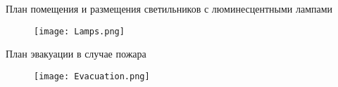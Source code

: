 \begingroup
\centering

\Appendix\label{appendix:lights}
\fancyfoot[R]{}
План помещения и размещения светильников с люминесцентными лампами
\begin{figure}[h]
    \centering
    \texttt{[image: Lamps.png]}
\end{figure}

\begin{landscape}
\Appendix\label{appendix:evacuation}
План эвакуации в случае пожара
\begin{figure}[h]
    \centering
    \texttt{[image: Evacuation.png]}
\end{figure}
\end{landscape}

\endgroup

\Appendix\label{appendix:english}
